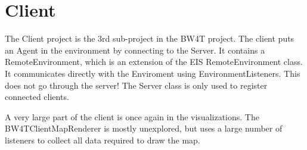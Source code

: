 \documentclass{article}
\begin{document}
\section*{Client}
The Client project is the 3rd sub-project in the BW4T project. The client puts an Agent in the  environment by connecting to the Server. It contains a RemoteEnvironment, which is an extension of the EIS RemoteEnvironment class. It communicates directly with the Enviroment using EnvironmentListeners. This does not go through the server! The Server class is only used to register connected clients. 

A very large part of the client is once again in the visualizations. The BW4TClientMapRenderer is mostly unexplored, but uses a large number of listeners to collect all data required to draw the map. 
\end{document}
